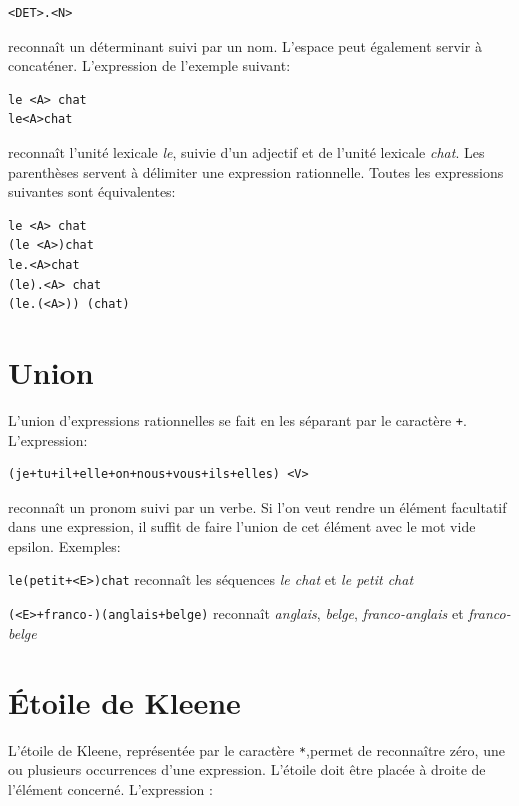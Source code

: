 \begin{verbatim}
<DET>.<N>
\end{verbatim}

\noindent reconnaît un déterminant suivi par un nom. L’espace peut également servir à concaténer.
L’expression de l’exemple suivant:


\begin{verbatim}
le <A> chat
le<A>chat
\end{verbatim}

\noindent reconnaît l’unité lexicale \textit{le}, suivie d’un adjectif et de l’unité lexicale \textit{chat}.
Les parenthèses  servent à délimiter une expression rationnelle.
Toutes les expressions suivantes sont équivalentes:


\begin{verbatim}
le <A> chat
(le <A>)chat
le.<A>chat
(le).<A> chat
(le.(<A>)) (chat)
\end{verbatim}

\section{Union}
\index{\verb$+$}
L’union d’expressions rationnelles se fait en les séparant par le caractère \verb$+$.
L’expression:

\begin{verbatim}
(je+tu+il+elle+on+nous+vous+ils+elles) <V>
\end{verbatim}

\noindent
reconnaît un pronom suivi par un verbe. Si l’on veut rendre un élément facultatif dans
une expression, il suffit de faire l’union de cet élément avec le mot vide epsilon.
 Exemples:

\bigskip
\noindent \verb$le(petit+<E>)chat$ reconnaît les séquences \textit{le chat}
et \textit{le petit chat}

\smallskip
\noindent \verb$(<E>+franco-)(anglais+belge)$ reconnaît \textit{anglais}, \textit{belge},
\textit{franco-anglais} et \textit{franco-belge}

\section{Étoile de Kleene}
\index{\verb+*+}
L’étoile de Kleene, représentée par le caractère \verb+*+,permet de reconnaître zéro, une ou
plusieurs occurrences d’une expression. L’étoile doit être placée à droite de l’élément concerné.
L’expression :


